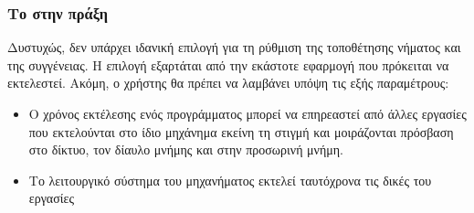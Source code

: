 \subsubsection{Το \emph{} στην πράξη}
Δυστυχώς, δεν υπάρχει ιδανική επιλογή για τη ρύθμιση της τοποθέτησης νήματος και της συγγένειας. Η επιλογή
εξαρτάται από την εκάστοτε εφαρμογή που πρόκειται να εκτελεστεί. Ακόμη, ο χρήστης θα πρέπει να λαμβάνει υπόψη τις εξής
παραμέτρους\cite{affinity3}:
\begin{itemize}
\item{Ο χρόνος εκτέλεσης ενός προγράμματος μπορεί να επηρεαστεί από άλλες εργασίες που εκτελούνται στο ίδιο μηχάνημα εκείνη τη στιγμή και μοιράζονται πρόσβαση στο δίκτυο, τον δίαυλο μνήμης και στην προσωρινή μνήμη.}
\item{Το λειτουργικό σύστημα του μηχανήματος εκτελεί ταυτόχρονα τις δικές του εργασίες}
\end{itemize}

